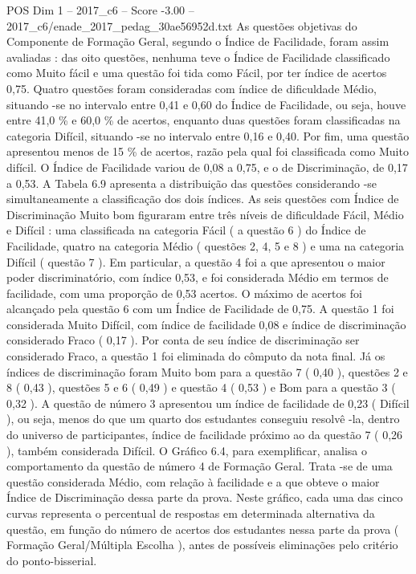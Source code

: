\begin{textsample}{POS Dim 1 – 2017\_c6 – Score -3.00 – 2017\_c6/enade\_2017\_pedag\_30ae56952d.txt}
As questões objetivas do Componente de Formação Geral, segundo o Índice de Facilidade, foram assim avaliadas : das oito questões, nenhuma teve o Índice de Facilidade classificado como Muito fácil e uma questão foi tida como Fácil, por ter índice de acertos 0,75.
Quatro questões foram consideradas com índice de dificuldade Médio, situando -se no intervalo entre 0,41 e 0,60 do Índice de Facilidade, ou seja, houve entre 41,0 \% e 60,0 \% de acertos, enquanto duas questões foram classificadas na categoria Difícil, situando -se no intervalo entre 0,16 e 0,40.
Por fim, uma questão apresentou menos de 15 \% de acertos, razão pela qual foi classificada como Muito difícil.
O Índice de Facilidade variou de 0,08 a 0,75, e o de Discriminação, de 0,17 a 0,53.
A Tabela 6.9 apresenta a distribuição das questões considerando -se simultaneamente a classificação dos dois índices.
As seis questões com Índice de Discriminação Muito bom figuraram entre três níveis de dificuldade Fácil, Médio e Difícil : uma classificada na categoria Fácil ( a questão 6 ) do Índice de Facilidade, quatro na categoria Médio ( questões 2, 4, 5 e 8 ) e uma na categoria Difícil ( questão 7 ).
Em particular, a questão 4 foi a que apresentou o maior poder discriminatório, com índice 0,53, e foi considerada Médio em termos de facilidade, com uma proporção de 0,53 acertos.
O máximo de acertos foi alcançado pela questão 6 com um Índice de Facilidade de 0,75.
A questão 1 foi considerada Muito Difícil, com índice de facilidade 0,08 e índice de discriminação considerado Fraco ( 0,17 ).
Por conta de seu índice de discriminação ser considerado Fraco, a questão 1 foi eliminada do cômputo da nota final.
Já os índices de discriminação foram Muito bom para a questão 7 ( 0,40 ), questões 2 e 8 ( 0,43 ), questões 5 e 6 ( 0,49 ) e questão 4 ( 0,53 ) e Bom para a questão 3 ( 0,32 ).
A questão de número 3 apresentou um índice de facilidade de 0,23 ( Difícil ), ou seja, menos do que um quarto dos estudantes conseguiu resolvê -la, dentro do universo de participantes, índice de facilidade próximo ao da questão 7 ( 0,26 ), também considerada Difícil.
O Gráfico 6.4, para exemplificar, analisa o comportamento da questão de número 4 de Formação Geral.
Trata -se de uma questão considerada Médio, com relação à facilidade e a que obteve o maior Índice de Discriminação dessa parte da prova.
Neste gráfico, cada uma das cinco curvas representa o percentual de respostas em determinada alternativa da questão, em função do número de acertos dos estudantes nessa parte da prova ( Formação Geral/Múltipla Escolha ), antes de possíveis eliminações pelo critério do ponto-bisserial.

\end{textsample}
